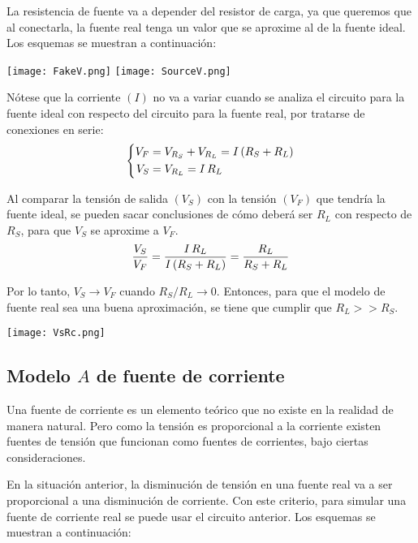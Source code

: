 \documentclass[a5paper,12pt,twoside]{book}
\begin{document}
La resistencia de fuente va a depender del resistor de carga, ya que queremos que al conectarla, la fuente real tenga un valor que se aproxime al de la fuente ideal. Los esquemas se muestran a continuación:

\begin{center}
    \texttt{[image: FakeV.png]}
    \texttt{[image: SourceV.png]}
\end{center}

Nótese que la corriente $(I)$ no va a variar cuando se analiza el circuito para la fuente ideal con respecto del circuito para la fuente real, por tratarse de conexiones en serie:
\begin{equation*}
    \left\{
    \begin{aligned}
        V_F &= V_{R_S} + V_{R_L} = I \left(R_S + R_L\right)
        \\
        V_S &= V_{R_L} = I \, R_L
    \end{aligned}
    \right.
\end{equation*}

Al comparar la tensión de salida $(V_S)$ con la tensión $(V_F)$ que tendría la fuente ideal, se pueden sacar conclusiones de cómo deberá ser $R_L$ con respecto de $R_S$, para que $V_S$ se aproxime a $V_F$.
\begin{equation*}
    \frac{V_S}{V_F} = \frac{I \, R_L}{I \left(R_S + R_L\right)} = \frac{R_L}{R_S + R_L}
\end{equation*}

Por lo tanto, $V_S \to V_F$ cuando $R_S / R_L \to 0$. Entonces, para que el modelo de fuente real sea una buena aproximación, se tiene que cumplir que $R_L >> R_S$.

\begin{center}
    \texttt{[image: VsRc.png]}
\end{center}


\subsection*{Modelo $A$ de fuente de corriente}

Una fuente de corriente es un elemento teórico que no existe en la realidad de manera natural. Pero como la tensión es proporcional a la corriente existen fuentes de tensión que funcionan como fuentes de corrientes, bajo ciertas consideraciones.

En la situación anterior, la disminución de tensión en una fuente real va a ser proporcional a una disminución de corriente. Con este criterio, para simular una fuente de corriente real se puede usar el circuito anterior. Los esquemas se muestran a continuación:
\end{document}
